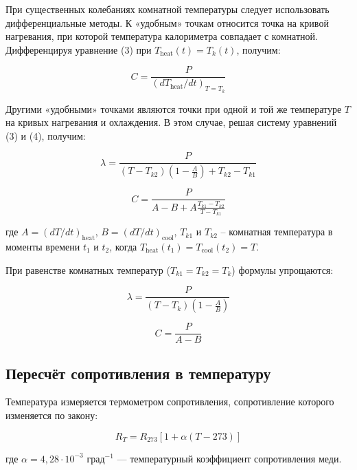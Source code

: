 \documentclass{article}
\begin{document}
	При существенных колебаниях комнатной температуры следует использовать дифференциальные методы. К «удобным» точкам относится точка на кривой нагревания, при которой температура калориметра совпадает с комнатной. Дифференцируя уравнение (3) при $T_{\text{heat}}(t) = T_k(t)$, получим:
	
	\begin{equation}
		C = \frac{P}{(dT_{\text{heat}}/dt)_{T=T_k}} \tag{7}
	\end{equation}
	
	Другими «удобными» точками являются точки при одной и той же температуре $T$ на кривых нагревания и охлаждения. В этом случае, решая систему уравнений (3) и (4), получим:
	
	\begin{equation}
		\lambda = \frac{P}{(T - T_{k2})(1 - \frac{A}{B}) + T_{k2} - T_{k1}} \tag{8}
	\end{equation}
	
	\begin{equation}
		C = \frac{P}{A - B + A \frac{T_{k1} - T_{k2}}{T - T_{k1}}} \tag{9}
	\end{equation}
	
	где $A = (dT/dt)_{\text{heat}}$, $B = (dT/dt)_{\text{cool}}$, $T_{k1}$ и $T_{k2}$ – комнатная температура в моменты времени $t_1$ и $t_2$, когда $T_{\text{heat}}(t_1) = T_{\text{cool}}(t_2) = T$.
	
	При равенстве комнатных температур ($T_{k1} = T_{k2} = T_k$) формулы упрощаются:
	
	\begin{equation}
		\lambda = \frac{P}{(T - T_k)(1 - \frac{A}{B})} \tag{10}
	\end{equation}
	
	\begin{equation}
		C = \frac{P}{A - B} \tag{11}
	\end{equation}
	
	\subsection*{Пересчёт сопротивления в температуру}
	
	Температура измеряется термометром сопротивления, сопротивление которого изменяется по закону:
	
	\begin{equation}
		R_T = R_{273}[1 + \alpha(T - 273)] \tag{12}
	\end{equation}
	
	где $\alpha = 4,28 \cdot 10^{-3}$ град$^{-1}$ — температурный коэффициент сопротивления меди.
	
\end{document}
